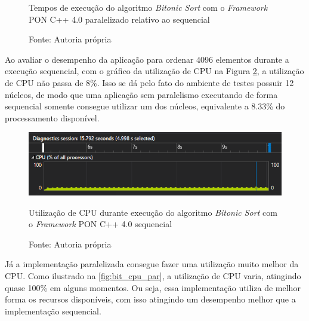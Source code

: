 \begin{figure}[!htb]
  \centering
  \caption{Tempos de execução do algoritmo \textit{Bitonic Sort} com o \textit{Framework} PON C++ 4.0 paralelizado relativo ao sequencial}
  \caption*{Fonte: Autoria própria}
  \label{fig:bitonic_bench_rel}
  \end{figure}

Ao avaliar o desempenho da aplicação para ordenar 4096 elementos durante a
execução sequencial, com o gráfico da utilização de CPU na Figura
\ref{fig:bit_cpu}, a utilização de CPU não passa de 8\%. Isso se dá pelo fato do
ambiente de testes possuir 12 núcleos, de modo que uma aplicação sem paralelismo
executando de forma sequencial somente consegue utilizar um dos núcleos,
equivalente a 8.33\% do processamento disponível.

\begin{figure}[!htb]
\centering
\includegraphics[width=\textwidth]{../figures/cpu_bitonic.png}
\smallskip
\caption{Utilização de CPU durante execução do algoritmo \textit{Bitonic Sort}
com o \textit{Framework} PON C++ 4.0 sequencial}
\caption*{Fonte: Autoria própria}
\label{fig:bit_cpu}
\end{figure}

Já a implementação paralelizada consegue fazer uma utilização muito melhor da
CPU. Como ilustrado na \ref{fig:bit_cpu_par}, a utilização de CPU varia,
atingindo quase 100\% em alguns momentos. Ou seja, essa implementação utiliza de
melhor forma os recursos disponíveis, com isso atingindo um desempenho melhor
que a implementação sequencial.

